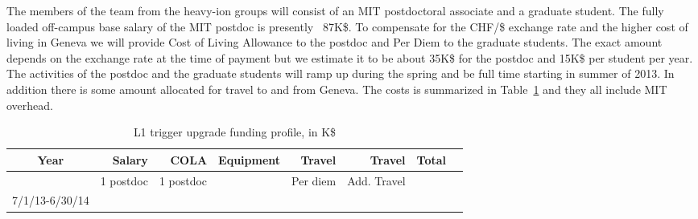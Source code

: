 The members of the team from the heavy-ion groups will consist of an MIT postdoctoral associate and a graduate student. The fully loaded off-campus base salary of the MIT postdoc is presently ~87K\$. To compensate for the CHF/\$ exchange rate and the higher cost of living in Geneva we will provide Cost of Living Allowance to the postdoc and Per Diem to the graduate students. The exact amount depends on the exchange rate at the time of payment but we estimate it to be about 35K\$ for the postdoc and 15K\$ per student per year.  The activities of the postdoc and the graduate students will ramp up during the spring and be full time starting in summer of 2013. In addition there is some amount allocated for travel to and from Geneva. The costs is summarized in Table~\ref{OpCost} and they all include MIT overhead.

\begin{table}[hbt]
\begin{center}
\begin{tabular}{|c|r|r|r|r|r|r|r|}
\hline
Year        & Salary & COLA & Equipment & Travel & Travel& Total \\ \hline
            &  1 postdoc   & 1 postdoc   &  & Per diem       &  Add. Travel     &     \\ \hline
7/1/13-6/30/14  &     &    &       &   &      &    \\ \hline
\end{tabular}
\end{center}
\caption{L1 trigger upgrade funding profile, in K\$}
\label{OpCost}
\end{table}
